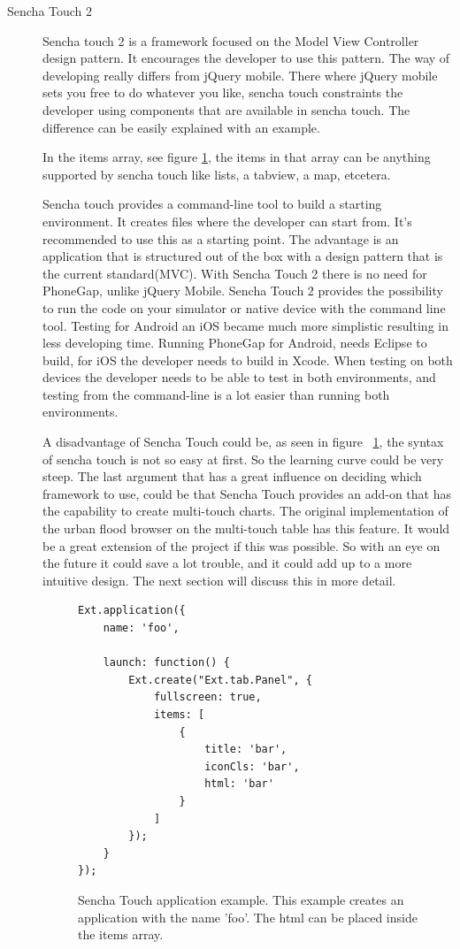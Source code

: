\begin{description}
\item [Sencha Touch 2]
Sencha touch 2 is a framework focused on the Model View Controller design pattern. It encourages the developer to use this pattern. The way of developing really differs from jQuery mobile. There where jQuery mobile sets you free to do whatever you like, sencha touch constraints the developer using components that are available in sencha touch. The difference can be easily explained with an example.

In the items array, see figure \ref{fig:sencha}, the items in that array can be anything supported by sencha touch like lists, a tabview, a map, etcetera. 

Sencha touch provides a command-line tool to build a starting environment. It creates files where the developer can start from. It's recommended to use this as a starting point. The advantage is an application that is structured out of the box with a design pattern that is the current standard(MVC). With Sencha Touch 2 there is no need for PhoneGap, unlike jQuery Mobile. Sencha Touch 2 provides the possibility to run the code on your simulator or native device with the command line tool. Testing for Android an iOS became much more simplistic resulting in less developing time. Running PhoneGap for Android, needs Eclipse to build, for iOS the developer needs to build in Xcode. When testing on both devices the developer needs to be able to test in both environments, and testing from the command-line is a lot easier than running both environments. 

A disadvantage of Sencha Touch could be, as seen in figure ~\ref{fig:sencha}, the syntax of sencha touch is not so easy at first. So the learning curve could be very steep.
The last argument that has a great influence on deciding which framework to use, could be that Sencha Touch provides an add-on that has the capability to create multi-touch charts. The original implementation of the urban flood browser on the multi-touch table has this feature. It would be a great extension of the project if this was possible. So with an eye on the future it could save a lot trouble, and it could add up to a more intuitive design. The next section will discuss this in more detail.

\begin{figure}[H]
\begin{lstlisting}
Ext.application({
    name: 'foo',

    launch: function() {
        Ext.create("Ext.tab.Panel", {
            fullscreen: true,
            items: [
                {
                    title: 'bar',
                    iconCls: 'bar',
                    html: 'bar'
                }
            ]
        });
    }
});
\end{lstlisting}
\caption{Sencha Touch application example. This example creates an application with the name 'foo'.  The html can be placed inside the items array. }
\label{fig:sencha}
\end{figure}
\end{description}

